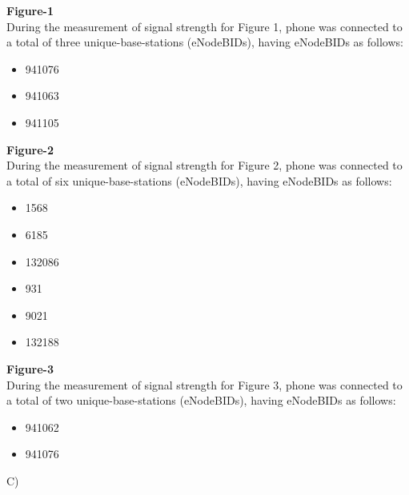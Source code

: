 \documentclass[11pt,a4paper]{article}
\begin{document}
\vspace{0.5cm}
\textbf{\Large{Figure-1}}\\
During the measurement of signal strength for Figure 1, phone was connected to a total of three unique-base-stations (eNodeBIDs), having eNodeBIDs as follows:
\vspace{-8pt}
\begin{itemize}[itemsep = -2 mm]
\item 941076
\item 941063
\item 941105
\end{itemize}
\vspace{0.5cm}
\textbf{\Large{Figure-2}}\\
 During the measurement of signal strength for Figure 2, phone was connected to a total of six unique-base-stations (eNodeBIDs), having eNodeBIDs as follows:
 \vspace{-8pt}
 \begin{itemize}[itemsep = -2mm]
     \item1568
 \item6185
 \item132086
 \item931
 \item9021
 \item132188
 \end{itemize}
 \vspace{0.5cm}
 \textbf{\Large{Figure-3}}\\
 During the measurement of signal strength for Figure 3, phone was connected to a total of two unique-base-stations (eNodeBIDs), having eNodeBIDs as follows:
 \vspace{-8pt}
 \begin{itemize}[itemsep = -2mm]
     \item 941062
     \item 941076
 \end{itemize}
  \vspace{0.5cm}
 {\huge C)}\\
\end{document}
